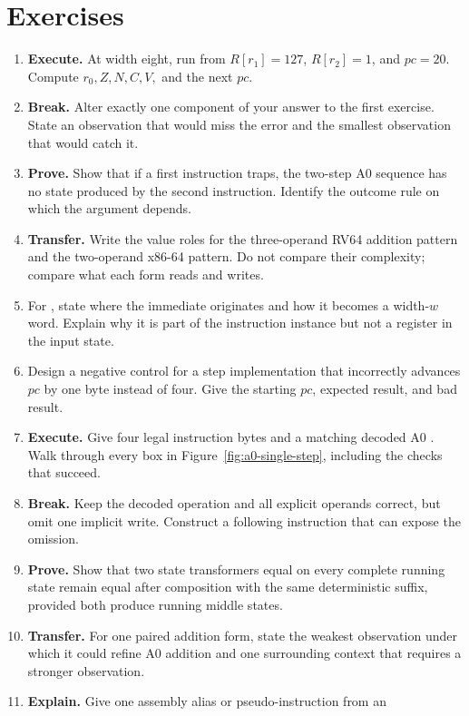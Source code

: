 \section{Exercises}

\begin{enumerate}
\item \textbf{Execute.} At width eight, run
 from \(R[r_1]=127\), \(R[r_2]=1\), and \(pc=20\).
Compute \(r_0,Z,N,C,V,\) and the next \(pc\).
\item \textbf{Break.} Alter exactly one component of your answer to the first
exercise. State an observation that would miss the error and the smallest
observation that would catch it.
\item \textbf{Prove.} Show that if a first instruction traps, the two-step A0
sequence has no state produced by the second instruction. Identify the outcome
rule on which the argument depends.
\item \textbf{Transfer.} Write the value roles for the three-operand RV64
addition pattern and the two-operand x86-64 pattern. Do not compare their
complexity; compare what each form reads and writes.
\item For , state where the immediate originates and how it
becomes a width-\(w\) word. Explain why it is part of the instruction instance
but not a register in the input state.
\item Design a negative control for a step implementation that incorrectly
advances \(pc\) by one byte instead of four. Give the starting \(pc\), expected
result, and bad result.
\item \textbf{Execute.} Give four legal instruction bytes and a matching
decoded A0 . Walk through every box in
Figure~\ref{fig:a0-single-step}, including the checks that succeed.
\item \textbf{Break.} Keep the decoded operation and all explicit operands
correct, but omit one implicit write. Construct a following instruction that
can expose the omission.
\item \textbf{Prove.} Show that two state transformers equal on every complete
running state remain equal after composition with the same deterministic
suffix, provided both produce running middle states.
\item \textbf{Transfer.} For one paired addition form, state the weakest
observation under which it could refine A0 addition and one surrounding
context that requires a stronger observation.
\item \textbf{Explain.} Give one assembly alias or pseudo-instruction from an

\end{enumerate}
